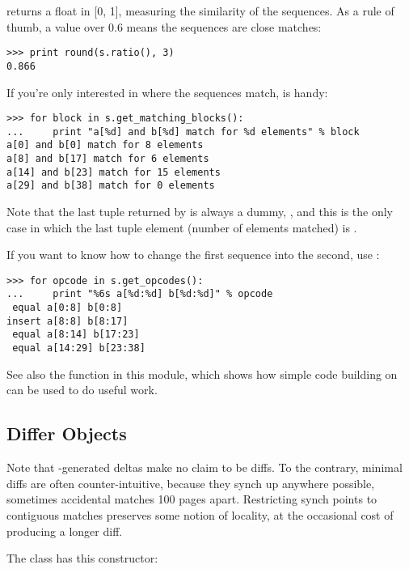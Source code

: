  returns a float in [0, 1], measuring the similarity
of the sequences.  As a rule of thumb, a  value over
0.6 means the sequences are close matches:

\begin{verbatim}
>>> print round(s.ratio(), 3)
0.866
\end{verbatim}

If you're only interested in where the sequences match,
 is handy:

\begin{verbatim}
>>> for block in s.get_matching_blocks():
...     print "a[%d] and b[%d] match for %d elements" % block
a[0] and b[0] match for 8 elements
a[8] and b[17] match for 6 elements
a[14] and b[23] match for 15 elements
a[29] and b[38] match for 0 elements
\end{verbatim}

Note that the last tuple returned by  is
always a dummy, , and this is
the only case in which the last tuple element (number of elements
matched) is .

If you want to know how to change the first sequence into the second,
use :

\begin{verbatim}
>>> for opcode in s.get_opcodes():
...     print "%6s a[%d:%d] b[%d:%d]" % opcode
 equal a[0:8] b[0:8]
insert a[8:8] b[8:17]
 equal a[8:14] b[17:23]
 equal a[14:29] b[23:38]
\end{verbatim}

See also the function  in this module,
which shows how simple code building on  can be
used to do useful work.


\subsection{Differ Objects \label{differ-objects}}

Note that -generated deltas make no claim to be
 diffs. To the contrary, minimal diffs are often
counter-intuitive, because they synch up anywhere possible, sometimes
accidental matches 100 pages apart. Restricting synch points to
contiguous matches preserves some notion of locality, at the
occasional cost of producing a longer diff.

The  class has this constructor:

